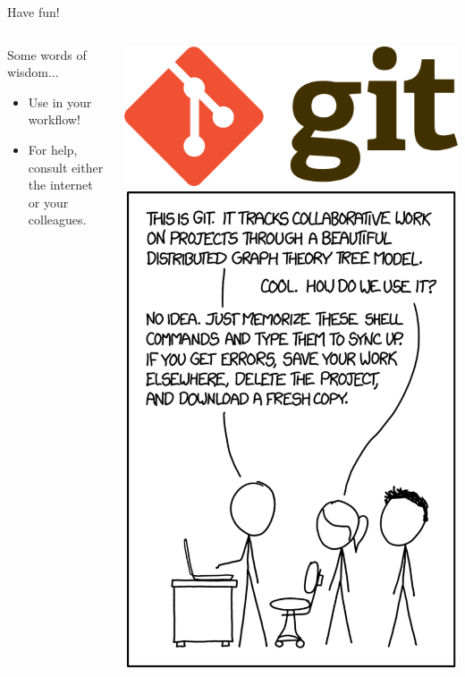 \begin{frame}{Have fun!}
\begin{columns}
\begin{block}{Some words of wisdom...}
\begin{itemize}
\item Use  in your  workflow!
\item For help, consult either the internet or your colleagues.
\end{itemize}
\end{block}
\vspace{3em}
\centering
\includegraphics[width=0.5\columnwidth]{images/logo_git.png}
\includegraphics[width=\columnwidth]{images/xkcd_git.png}
\end{columns}
\end{frame}


